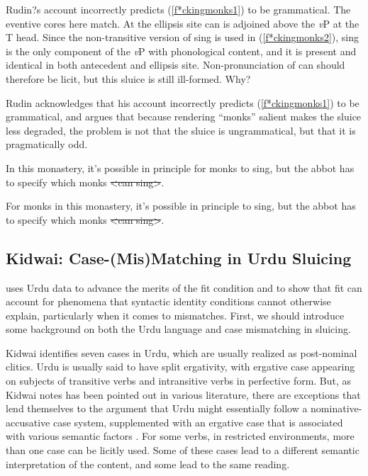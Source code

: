 \documentclass{turabian-researchpaper}
\begin{document}
Rudin?s account incorrectly predicts (\ref{f*ckingmonks1}) to be grammatical. The eventive cores here match. At the ellipsis site can is adjoined above the \textit{v}P at the T head. Since the non-transitive version of sing is used in (\ref{f*ckingmonks2}), sing is the only component of the \textit{v}P with phonological content, and it is present and identical in both antecedent and ellipsis site. Non-pronunciation of can should therefore be licit, but this sluice is still ill-formed. Why? 

Rudin acknowledges that his account incorrectly predicts (\ref{f*ckingmonks1}) to be grammatical, and argues that because rendering ``monks'' salient makes the sluice less degraded, the problem is not that the sluice is ungrammatical, but that it is pragmatically odd. 

\begin{exe}
\ex\label{f*ckingmonks3} In this monastery, it's possible in principle for monks to sing, but the abbot has to specify which monks \sout{\textless can sing\textgreater}.
\end{exe}

\begin{exe}
\ex\label{f*ckingmonks4} For monks in this monastery, it's possible in principle to sing, but the abbot has to specify which monks \sout{\textless can sing\textgreater}.
\end{exe} 

\subsection{Kidwai: Case-(Mis)Matching in Urdu Sluicing}

\citet{kidwai} uses Urdu data to advance the merits of the fit condition and to show that fit can account for phenomena that syntactic identity conditions cannot otherwise explain, particularly when it comes to mismatches. First, we should introduce some background on both the Urdu language and case mismatching in sluicing. 

Kidwai identifies seven cases in Urdu, which are usually realized as post-nominal clitics. Urdu is usually said to have split ergativity, with ergative case appearing on subjects of transitive verbs and intransitive verbs in perfective form. But, as Kidwai notes has been pointed out in various literature, there are exceptions that lend themselves to the argument that Urdu might essentially follow a nominative-accusative case system, supplemented with an ergative case that is associated with various semantic factors \citep{butt}. For some verbs, in restricted environments, more than one case can be licitly used. Some of these cases lead to a different semantic interpretation of the content, and some lead to the same reading. 
\end{document}

